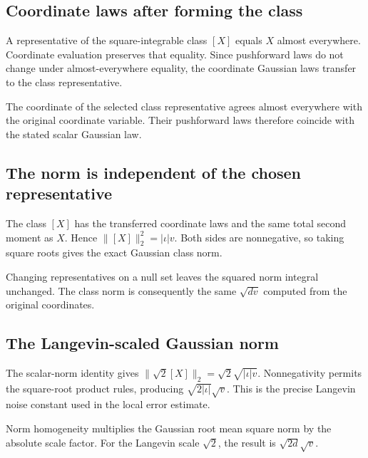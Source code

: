 \documentclass[11pt,a4paper]{report}
\begin{document}
\subsection{\texorpdfstring{Coordinate laws after forming the class}{Coordinate laws after forming the class}}
\label{report-step-UnadjustedLangevin-GaussianCoordinates-lean-5}


A representative of the square-integrable class \([X]\) equals \(X\) almost everywhere. Coordinate evaluation preserves that equality. Since pushforward laws do not change under almost-everywhere equality, the coordinate Gaussian laws transfer to the class representative.



The coordinate of the selected class representative agrees almost everywhere with the original coordinate variable. Their pushforward laws therefore coincide with the stated scalar Gaussian law.

\subsection{\texorpdfstring{The norm is independent of the chosen representative}{The norm is independent of the chosen representative}}
\label{report-step-UnadjustedLangevin-GaussianCoordinates-lean-6}


The class \([X]\) has the transferred coordinate laws and the same total second moment as \(X\). Hence \(\|[X]\|_2^2=|\iota|v\). Both sides are nonnegative, so taking square roots gives the exact Gaussian class norm.



Changing representatives on a null set leaves the squared norm integral unchanged. The class norm is consequently the same \(\sqrt{dv}\) computed from the original coordinates.

\subsection{\texorpdfstring{The Langevin-scaled Gaussian norm}{The Langevin-scaled Gaussian norm}}
\label{report-step-UnadjustedLangevin-GaussianCoordinates-lean-7}


The scalar-norm identity gives \(\|\sqrt2[X]\|_2=\sqrt2\sqrt{|\iota|v}\). Nonnegativity permits the square-root product rules, producing \(\sqrt{2|\iota|}\sqrt v\). This is the precise Langevin noise constant used in the local error estimate.



Norm homogeneity multiplies the Gaussian root mean square norm by the absolute scale factor. For the Langevin scale \(\sqrt2\), the result is \(\sqrt{2d}\sqrt v\).
\end{document}
